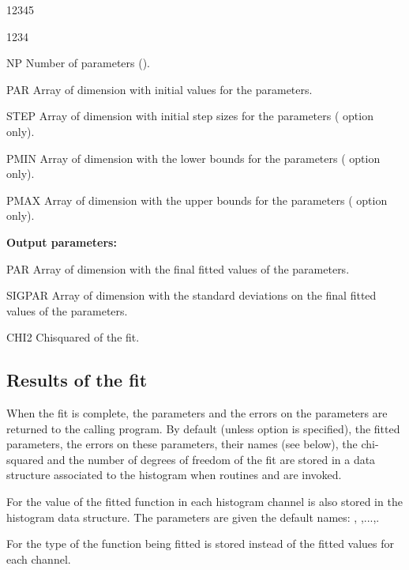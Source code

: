 \begin{DLtt}{12345}
\begin{DLtt}{1234}
\end{DLtt}
\item[NP] Number of parameters ().
\item[PAR] Array of dimension  with initial values for
      the parameters.
\item[STEP] Array of dimension  with initial step sizes
      for the parameters ( option only).
\item[PMIN] Array of dimension  with the lower bounds
      for the parameters ( option only).
\item[PMAX] Array of dimension  with the upper bounds
      for the parameters ( option only).
\item[{\rm\bf Output parameters:}]
\item[PAR] Array of dimension  with the final fitted values
      of the parameters.
\item[SIGPAR] Array of dimension  with the standard deviations
      on the final fitted values of the parameters.
\item[CHI2] Chisquared of the fit.
\end{DLtt}
 
\newpage%


\subsection{Results of the fit}
\label{sec:resultfit}

When the fit is complete, the parameters and the errors on the
parameters are returned to the calling program.
By default (unless option  is specified),
the fitted parameters, the errors on these parameters,
their names (see below),
the chi-squared and the number of degrees of freedom of the fit
are stored in a data structure associated to the histogram 
when routines  and  are invoked.

\begin{UL}
\item For  the value of the fitted function
      in each histogram channel is also stored in the histogram
      data structure.
      The parameters are given the default names:
      , ,...,.
\item For  the type of the function being fitted
      is stored instead of the fitted values for each channel.
\end{UL}


